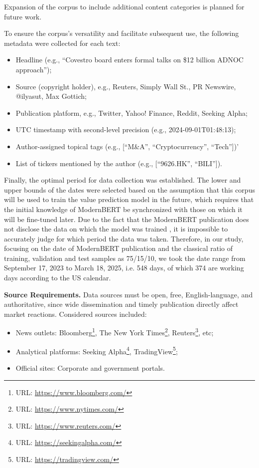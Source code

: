 Expansion of the corpus to include additional content categories is planned for future work.

To ensure the corpus's versatility and facilitate subsequent use, the following metadata were collected for each text:

\begin{itemize}
    \item Headline (e.g., “Covestro board enters formal talks on \$12 billion ADNOC approach”);
    \item Source (copyright holder), e.g., Reuters, Simply Wall St., PR Newswire, @ilyasut, Max Gottich;
    \item Publication platform, e.g., Twitter, Yahoo! Finance, Reddit, Seeking Alpha;
    \item UTC timestamp with second-level precision (e.g., 2024-09-01T01:48:13);
    \item Author-assigned topical tags (e.g., [“M\&A”, “Cryptocurrency”, “Tech”])'
    \item List of tickers mentioned by the author (e.g., [“9626.HK”, “BILI”]).
\end{itemize}

Finally, the optimal period for data collection was established. The lower and upper bounds of the dates were selected
based on the assumption that this corpus will be used to train the value prediction model in the future, which requires
that the initial knowledge of ModernBERT be synchronized with those on which it will be fine-tuned later. Due to the fact
that the ModernBERT publication does not disclose the data on which the model was trained \parencite{Warner2024ModernBERT},
it is impossible to accurately judge for which period the data was taken. Therefore, in our study, focusing
on the date of ModernBERT publication \parencite{Warner2024ModernBERT} and the classical ratio of training,
validation and test samples as 75/15/10, we took the date range from September 17, 2023 to March 18, 2025, i.e. 548 days,
of which 374 are working days according to the US calendar.

\textbf{Source Requirements.} Data sources must be open, free, English-language, and authoritative, since wide
dissemination and timely publication directly affect market reactions. Considered sources included:

\begin{itemize}
    \item News outlets: Bloomberg\footnote{URL: \url{https://www.bloomberg.com/}},
    The New York Times\footnote{URL: \url{https://www.nytimes.com/}},
    Reuters\footnote{URL: \url{https://www.reuters.com/}}, etc;
    \item Analytical platforms: Seeking Alpha\footnote{URL: \url{https://seekingalpha.com/}},
    TradingView\footnote{URL: \url{https://tradingview.com/}};
    \item Official sites: Corporate and government portals.
\end{itemize}

